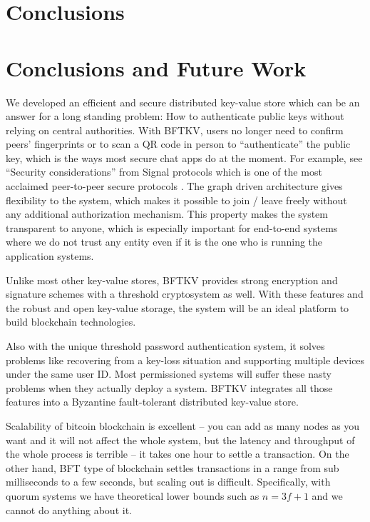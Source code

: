 \ifdefined\ABSTRACT
\section{Conclusions}
\else
\section{Conclusions and Future Work}
\fi
We developed an efficient and secure distributed key-value store which
can be an answer for a long standing problem: How to authenticate
public keys without relying on central authorities. With BFTKV,
users no longer need to confirm peers' fingerprints or to scan a QR
code in person to ``authenticate'' the public key, which is the ways
most secure chat apps do at the moment. For example, see ``Security
considerations'' from Signal protocols which is one of the most
acclaimed peer-to-peer secure protocols \cite{signal}.
The graph driven architecture gives flexibility to the system, which
makes it possible to join / leave freely without any additional
authorization mechanism. This property makes the system transparent to
anyone, which is especially important for end-to-end systems where we
do not trust any entity even if it is the one who is running the
application systems.

Unlike most other key-value stores, BFTKV provides strong encryption
and signature schemes with a threshold cryptosystem as well. With
these features and the robust and open key-value storage, the system
will be an ideal platform to build blockchain technologies.

Also with the unique threshold password authentication system, it
solves problems like recovering from a key-loss situation and
supporting multiple devices under the same user ID. Most permissioned
systems will suffer these nasty problems when they actually deploy a
system. BFTKV integrates all those features into a Byzantine
fault-tolerant distributed key-value store.

\ifdefined\ABSTRACT
\else
{}
Scalability of bitcoin blockchain is excellent -- you can add as many
nodes as you want and it will not affect the whole system, but the
latency and throughput of the whole process is terrible -- it takes
one hour to settle a transaction.
On the other hand, BFT type of blockchain settles transactions in a
range from sub milliseconds to a few seconds, but scaling out is
difficult. Specifically, with quorum systems we have theoretical lower
bounds such as $n = 3f + 1$ and we cannot do anything about it.

